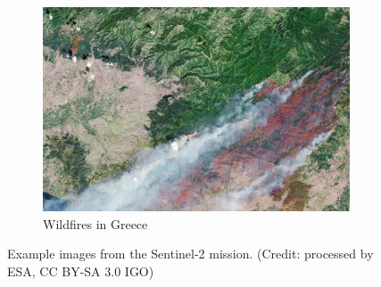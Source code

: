 \documentclass[conference]{IEEEtran}
\newcommand\sentinelii{Sentinel-2\xspace}
\begin{document}
\begin{figure}
\begin{subfigure}{.32\linewidth}
    \includegraphics[width=\linewidth]{figures/Wildfires_continue_to_rage_in_Greece}
    \caption{Wildfires in Greece}
    \label{fig:sentinel_greece}
  \end{subfigure}

  \caption{Example images from the \sentinelii mission. (Credit: processed by ESA, CC BY-SA 3.0 IGO)}
  \label{fig:sentinelii}
\end{figure}


  
\end{document}
